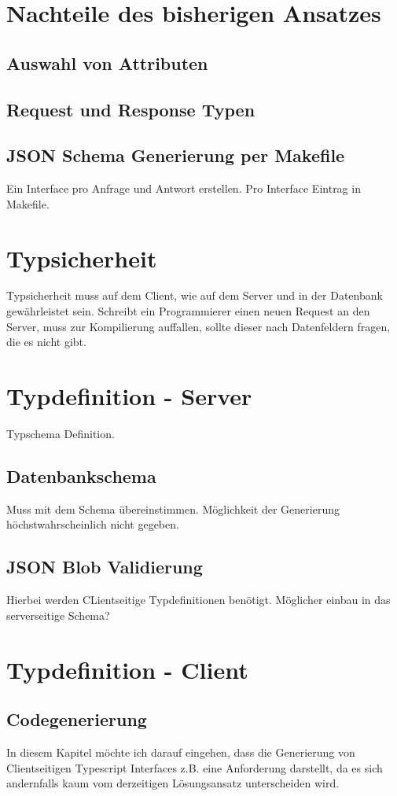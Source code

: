 \section{Nachteile des bisherigen Ansatzes}
\subsection{Auswahl von Attributen}
\subsection{Request und Response Typen}
\subsection{JSON Schema Generierung per Makefile}
Ein Interface pro Anfrage und Antwort erstellen. Pro Interface Eintrag in Makefile.

\section{Typsicherheit}
Typsicherheit muss auf dem Client, wie auf dem Server und in der Datenbank gewährleistet sein. Schreibt ein Programmierer einen neuen Request an den Server,
muss zur Kompilierung auffallen, sollte dieser nach Datenfeldern fragen, die es nicht gibt.

\section{Typdefinition - Server}
Typschema Definition.

\subsection{Datenbankschema}
Muss mit dem Schema übereinstimmen. Möglichkeit der Generierung höchstwahrscheinlich nicht gegeben.
\subsection{JSON Blob Validierung}
Hierbei werden CLientseitige Typdefinitionen benötigt. Möglicher einbau in das serverseitige Schema?

\section{Typdefinition - Client}
\subsection{Codegenerierung}
In diesem Kapitel möchte ich darauf eingehen, dass die Generierung von Clientseitigen Typescript Interfaces z.B. eine Anforderung darstellt, 
da es sich andernfalls kaum vom derzeitigen Lösungsansatz unterscheiden wird. 


